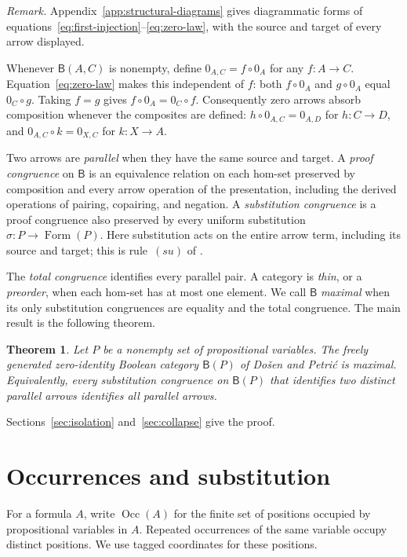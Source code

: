 \documentclass[11pt]{article}
\newtheorem{theorem}{Theorem}[section]
\newcommand{\B}{\mathsf B}
\newcommand{\Occ}{\operatorname{Occ}}
\newcommand{\FormulaSet}{\operatorname{Form}}
\begin{document}
\noindent\textit{Remark.}
Appendix~\ref{app:structural-diagrams} gives diagrammatic forms of
equations~\eqref{eq:first-injection}--\eqref{eq:zero-law}, with the
source and target of every arrow displayed.

Whenever $\B(A,C)$ is nonempty, define $0_{A,C}=f\circ0_A$ for any
$f:A\to C$. Equation~\eqref{eq:zero-law} makes this independent of
$f$: both $f\circ0_A$ and $g\circ0_A$ equal $0_C\circ g$.
Taking $f=g$ gives $f\circ0_A=0_C\circ f$. Consequently zero arrows
absorb composition whenever the composites are defined:
$h\circ0_{A,C}=0_{A,D}$ for $h:C\to D$, and
$0_{A,C}\circ k=0_{X,C}$ for $k:X\to A$.

Two arrows are \emph{parallel} when they have the same source and
target. A \emph{proof congruence} on $\B$ is an equivalence relation
on each hom-set preserved by composition and every arrow operation
of the presentation, including the derived operations of pairing,
copairing, and negation.
A \emph{substitution congruence} is a proof congruence also preserved
by every uniform substitution $\sigma:P\to\FormulaSet(P)$.
Here substitution acts on the entire arrow term, including its source
and target; this is rule~$(su)$ of \cite[\S2.7, p.~51]{DP}.

The \emph{total congruence} identifies every parallel pair. A category
is \emph{thin}, or a \emph{preorder}, when each hom-set has at most one
element. We call $\B$ \emph{maximal} when its only substitution
congruences are equality and the total congruence. The main result is
the following theorem.

\begin{theorem}\label{thm:main}
Let $P$ be a nonempty set of propositional variables. The freely
generated zero-identity Boolean category $\B(P)$ of Do\v{s}en and
Petri\'c is maximal. Equivalently, every substitution congruence on
$\B(P)$ that identifies two distinct parallel arrows identifies all
parallel arrows.
\end{theorem}

Sections~\ref{sec:isolation} and~\ref{sec:collapse} give the proof.

\section{Occurrences and substitution}\label{sec:occurrences}

For a formula $A$, write $\Occ(A)$ for the finite set of positions
occupied by propositional variables in $A$. Repeated occurrences of the
same variable occupy distinct positions. We use tagged coordinates for
these positions.
\end{document}
